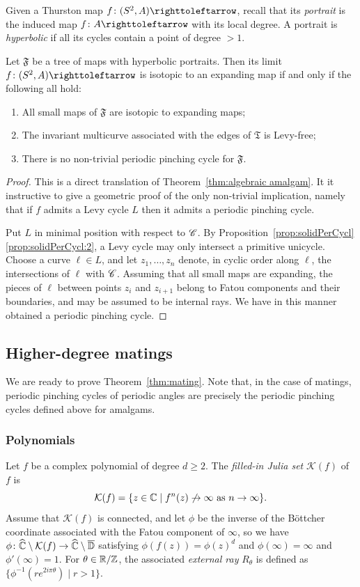 \documentclass{amsart}
\begin{document}
Given a Thurston map $f\colon(S^2,A)\selfmap$, recall that its
\emph{portrait} is the induced map $f\colon A\selfmap$ with its local
degree. A portrait is \emph{hyperbolic} if all its cycles contain a
point of degree $>1$.

\begin{thm}\label{thm:expamalgam}
  Let $\mathfrak F$ be a tree of maps with hyperbolic portraits. Then
  its limit $f\colon(S^2,A)\selfmap$ is isotopic to an expanding map
  if and only if the following all hold:
  \begin{enumerate}
  \item All small maps of $\mathfrak F$ are isotopic to expanding
    maps;
  \item The invariant multicurve associated with the edges of
    $\mathfrak T$ is Levy-free;
  \item There is no non-trivial periodic pinching cycle for
    $\mathfrak F$.
  \end{enumerate}
\end{thm}
\begin{proof}
  This is a direct translation of Theorem~\ref{thm:algebraic
    amalgam}. It it instructive to give a geometric proof of the only
  non-trivial implication, namely that if $f$ admits a Levy cycle $L$
  then it admits a periodic pinching cycle.

  Put $L$ in minimal position with respect to ${\mathscr C}$. By
  Proposition~\ref{prop:solidPerCycl}\eqref{prop:solidPerCycl:2}, a
  Levy cycle may only intersect a primitive unicycle. Choose a curve
  $\ell\in L$, and let $z_1,\dots,z_n$ denote, in cyclic order along
  $\ell$, the intersections of $\ell$ with ${\mathscr C}$. Assuming that all
  small maps are expanding, the pieces of $\ell$ between points $z_i$
  and $z_{i+1}$ belong to Fatou components and their boundaries, and
  may be assumed to be internal rays. We have in this manner obtained
  a periodic pinching cycle.
\end{proof}

\subsection{Higher-degree matings}
We are ready to prove Theorem~\ref{thm:mating}. Note that, in the
case of matings, periodic pinching cycles of periodic angles are
precisely the periodic pinching cycles defined above for amalgams.

\subsubsection{Polynomials}\label{ss:polynomials}
Let $f$ be a complex polynomial of degree $d\ge2$. The \emph{filled-in
  Julia set} $\mathcal K(f)$ of $f$ is
\[\mathcal K(f)=\{z\in{\mathbb C}\mid f^n(z)\not\to\infty\text{ as }n\to\infty\}.\]
Assume that $\mathcal K(f)$ is connected, and let $\phi$ be the
inverse of the B\"ottcher coordinate associated with the Fatou
component of $\infty$, so we have
$\phi\colon{\widehat{{\mathbb C}}}\setminus \mathcal K(f)\to{\widehat{{\mathbb C}}}\setminus\overline{\mathbb
  D}$ satisfying $\phi(f(z))=\phi(z)^d$ and $\phi(\infty)=\infty$ and
$\phi'(\infty)=1$. For $\theta\in{\mathbb R}/{\mathbb Z}$, the associated \emph{external
  ray} $R_\theta$ is defined as
$\{\phi^{-1}(r e^{2i\pi\theta})\mid r>1\}$.
\end{document}
